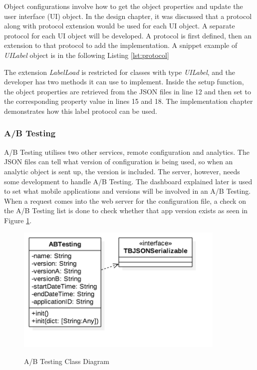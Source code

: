 Object configurations involve how to get the object properties and update the user interface (UI) object. In the design chapter, it was discussed that a protocol along with protocol extension would be used for each UI object. A separate protocol for each UI object will be developed.  A protocol is first defined, then an extension to that protocol to add the implementation. A snippet example of \textit{UILabel} object is in the following Listing \ref{lst:protocol}

The extension \textit{LabelLoad} is restricted for classes with type \textit{UILabel}, and the developer has two methods it can use to implement. Inside the setup function, the object properties are retrieved from the JSON files in line 12 and then set to the corresponding property value in lines 15 and 18. The implementation chapter demonstrates how this label protocol can be used.



\subsubsection{A/B Testing} \label{dev:sub_ab}

A/B Testing utilises two other services, remote configuration and analytics. The JSON files can tell what version of configuration is being used, so when an analytic object is sent up, the version is included. The server, however, needs some development to handle A/B Testing. The dashboard explained later is used to set what mobile applications and versions will be involved in an A/B Testing. When a request comes into the web server for the configuration file, a check on the A/B Testing list is done to check whether that app version exists as seen in Figure \ref{fig:abtesting-cd}. 

\begin{figure}[!h]
    \caption{A/B Testing Class Diagram}
    \centering
    \includegraphics[width=100mm]{images/classdiagrams/ABTesting}
    \label{fig:abtesting-cd}
\end{figure}

